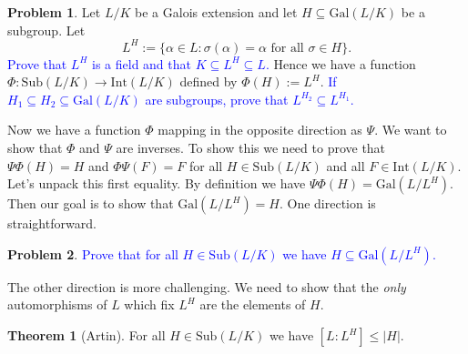 \documentclass[11pt]{article}
\def\gal{\mathrm{Gal}}
\def\inter{\mathrm{Int}}
\def\sub{\mathrm{Sub}}
\theoremstyle{definition}
\newtheorem{theorem}{Theorem}[section]
\newtheorem{problem}{Problem}[section]
\numberwithin{equation}{subsection}
\newcommand{\blue}[1]{\textcolor{blue}{#1}}
\begin{document}
\begin{problem}
    Let $L/K$ be a Galois extension and let $H \subseteq \gal(L/K)$ be a subgroup.
    Let 
    \[
        L^H := \{\alpha \in L : \sigma(\alpha) = \alpha \text{ for all }\sigma \in H\}.
    \]
    \blue{Prove that $L^H$ is a field and that $K \subseteq L^H \subseteq L$.}
    Hence we have a function $\Phi : \sub(L/K) \to \inter(L/K)$ defined by $\Phi(H) := L^H$.
    \blue{If $H_1 \subseteq H_2 \subseteq \gal(L/K)$ are subgroups, prove that $L^{H_2} \subseteq L^{H_1}$.}
\end{problem}

Now we have a function $\Phi$ mapping in the opposite direction as $\Psi$.
We want to show that $\Phi$ and $\Psi$ are inverses.
To show this we need to prove that $\Psi\Phi(H) = H$ and $\Phi\Psi(F) = F$ for all $H \in \sub(L/K)$ and all $F \in \inter(L/K)$.
Let's unpack this first equality.
By definition we have $\Psi\Phi(H) = \gal(L/L^H)$.
Then our goal is to show that $\gal(L/L^H) = H$.
One direction is straightforward.

\begin{problem}
    \blue{Prove that for all $H \in \sub(L/K)$ we have $H \subseteq \gal(L/L^H)$.}
\end{problem}

The other direction is more challenging.
We need to show that the \emph{only} automorphisms of $L$ which fix $L^H$ are the elements of $H$.

\begin{theorem}[Artin]
    For all $H \in \sub(L/K)$ we have $[L : L^H] \leq |H|$.
\end{theorem}
\end{document}
